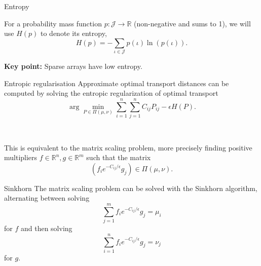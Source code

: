 \documentclass{beamer}
\begin{document}

\begin{frame}{Entropy}
\pause
    \begin{definition}
    For a probability mass function $p:\mathcal J\rightarrow \mathbb R$ (non-negative and sums to 1), we will use $H(p)$ to denote its entropy,
\begin{equation} 
    H(p) = -\sum_{\iota \in \mathcal J} p(\iota) \ln(p(\iota)) \label{eq:Entropy}. 
\end{equation}
    \end{definition}
    \pause
    \textbf{Key point:} Sparse arrays have low entropy. 
\end{frame}


\begin{frame}{Entropic regularisation}
    Approximate optimal transport distances can be computed by solving the entropic regularization of optimal transport
    $$ \arg\min_{P\in \Pi(\mu,\nu)} \sum_{i=1}^n \sum_{j=1}^n C_{ij}P_{ij} - \epsilon H(P). $$
    \pause
    
    ~
    
    This is equivalent to the matrix scaling problem, more precisely finding positive multipliers $f\in \mathbb R^n, g\in \mathbb R^m$ such that the matrix
    $$ (f_i e^{-C_{ij}/\epsilon} g_j) \in \Pi(\mu,\nu). $$

\end{frame}


\begin{frame}{Sinkhorn}
    The matrix scaling problem can be solved with the Sinkhorn algorithm, alternating between solving 
    $$\sum_{j=1}^m f_i e^{-C_{ij}/\epsilon} g_j = \mu_i$$ 
    for $f$ 
    \pause 
    and then solving 
    $$ \sum_{i=1}^n f_i e^{-C_{ij}/\epsilon} g_j = \nu_j $$
    for $g$. 
    
\end{frame}
\end{document}
